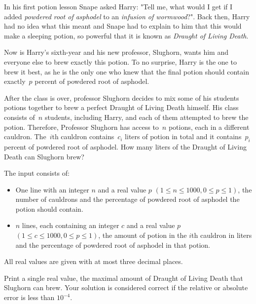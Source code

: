 
In his first potion lesson Snape asked Harry: "Tell me, what would I get if I added \emph{powdered root of asphodel} to an \emph{infusion of wormwood}?".
Back then, Harry had no idea what this meant and Snape had to explain to him that this would make a sleeping potion, so powerful that it is known as \emph{Draught of Living Death}.

Now is Harry's sixth-year and his new professor, Slughorn, wants him and everyone else to brew exactly this potion.
To no surprise, Harry is the one to brew it best, as he is the only one who knew that the final potion should contain exactly~$p$ percent of powdered root of asphodel.

After the class is over, professor Slughorn decides to mix some of his students potions together to brew a perfect Draught of Living Death himself.
His class consists of~$n$ students, including Harry, and each of them attempted to brew the potion.
Therefore, Professor Slughorn has access to~$n$ potions, each in a different cauldron.
The~$i$th cauldron contains~$c_i$ liters of potion in total and it contains~$p_i$ percent of powdered root of asphodel.
How many liters of the Draught of Living Death can Slughorn brew?

\begin{Input}
The input consists of:
\begin{itemize}
	\item One line with an integer $n$ and a real value $p$ $(1\leq n \leq 1000, 0\leq p\leq1)$, the number of cauldrons and the percentage of powdered root of asphodel the potion should contain.
	\item $n$ lines, each containing an integer $c$ and a real value $p$ $(1\leq c\leq1000, 0\leq p\leq1)$, the amount of potion in the $i$th cauldron in liters and the percentage of powdered root of asphodel in that potion.
\end{itemize}
All real values are given with at most three decimal places.
\end{Input}
\begin{Output}
Print a single real value, the maximal amount of Draught of Living Death that Slughorn can brew.
Your solution is considered correct if the relative or absolute error is less than $10^{-4}$.
\end{Output}
